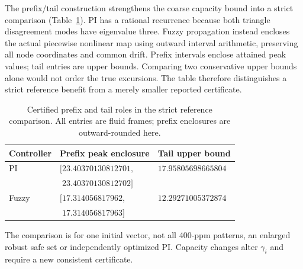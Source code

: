 The prefix/tail construction strengthens the coarse capacity bound
into a strict comparison (Table~\ref{tab:btd_prefix_tail}). PI has
a rational recurrence because both triangle disagreement modes
have eigenvalue three. Fuzzy propagation instead encloses the actual
piecewise nonlinear map using outward interval arithmetic, preserving
all node coordinates and common drift. Prefix intervals enclose attained
peak values; tail entries are upper bounds. Comparing two conservative
upper bounds alone would not order the true excursions. The table
therefore distinguishes a strict reference benefit from a merely
smaller reported certificate.

\begin{table}[t]
\caption{Certified prefix and tail roles in the strict reference comparison.
All entries are fluid frames; prefix enclosures are outward-rounded here.}
\label{tab:btd_prefix_tail}
\centering
\begin{tabular}{@{}lll@{}}\toprule
Controller & Prefix peak enclosure & Tail upper bound\\\midrule
PI & $[23.40370130812701,$ & $17.95805698665804$\\
 & $\phantom{[}23.40370130812702]$ & \\
Fuzzy & $[17.314056817962,$ & $12.29271005372874$\\
 & $\phantom{[}17.314056817963]$ & \\\bottomrule
\end{tabular}
\end{table}

The comparison is for one initial vector, not all 400-ppm patterns,
an enlarged robust safe set or independently optimized PI. Capacity
changes alter $\gamma_i$ and require a new consistent certificate.
